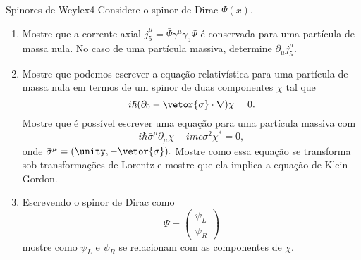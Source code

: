 \begin{exercício}{Spinores de Weyl}{ex4}
    Considere o spinor de Dirac \(\Psi(x)\).
    \begin{enumerate}[label=(\alph*)]
        \item Mostre que a corrente axial \(j_5^\mu = \bar{\Psi} \gamma^\mu \gamma_5 \Psi\) é conservada para uma partícula de massa nula. No caso de uma partícula massiva, determine \(\partial_\mu j^\mu_5.\)
        \item Mostre que podemos escrever a equação relativística para uma partícula de massa nula em termos de um spinor de duas componentes \(\chi\) tal que
            \begin{equation*}
                i\hbar (\partial_0 - \vetor{\sigma}\cdot \nabla) \chi = 0.
            \end{equation*}
            Mostre que é possível escrever uma equação para uma partícula massiva com
            \begin{equation*}
                i\hbar \bar{\sigma}^\mu \partial_\mu \chi - imc \sigma^2 \chi^* = 0,
            \end{equation*}
            onde \(\bar{\sigma}^\mu = (\unity, - \vetor{\sigma}).\) Mostre como essa equação se transforma sob transformações de Lorentz e mostre que ela implica a equação de Klein-Gordon.
        \item Escrevendo o spinor de Dirac como
            \begin{equation*}
                \Psi = \begin{pmatrix}
                    \psi_L\\
                    \psi_R
                \end{pmatrix}
            \end{equation*}
            mostre como \(\psi_L\) e \(\psi_R\) se relacionam com as componentes de \(\chi.\)
    \end{enumerate}
\end{exercício}
